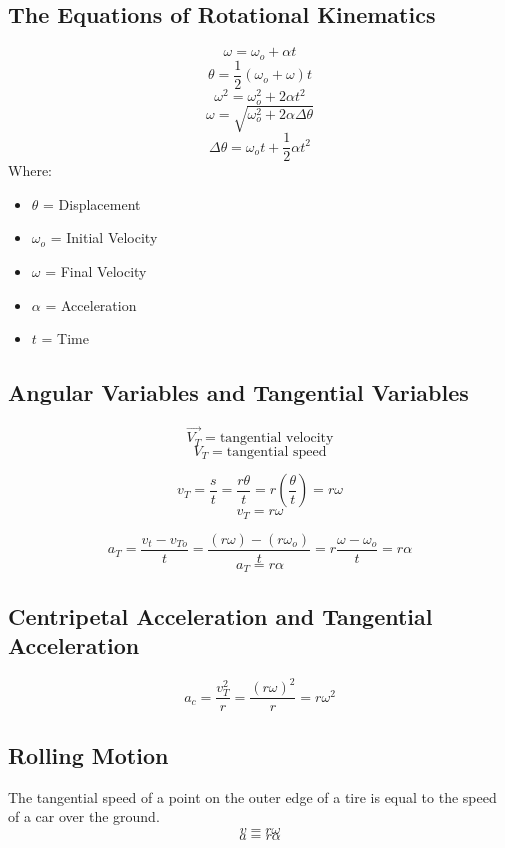\subsection{The Equations of Rotational Kinematics}
\[\omega=\omega_o+\alpha t\]
\[\theta=\frac{1}{2}(\omega_o+\omega)t\]
\[\omega^2=\omega^2_o+2\alpha t^2\]
\[\omega = \sqrt{\omega^2_o + 2 \alpha\Delta\theta}\]
\[\Delta \theta=\omega_o t+\frac{1}{2}\alpha t^2\]
Where: \begin{itemize}
	\item $\theta$ = Displacement
	\item $\omega_o$ = Initial Velocity
	\item $\omega$ = Final Velocity
	\item $\alpha$ = Acceleration
	\item $t$ = Time
\end{itemize}

\subsection{Angular Variables and Tangential Variables}
\[\overrightarrow{V_T} = \text{tangential velocity}\]
\[V_T = \text{tangential speed}\]

\[v_T=\frac{s}{t}=\frac{r\theta}{t}=r\left(\frac{\theta}{t}\right)=r\omega\]
\[v_T=r\omega\]

\[a_T=\frac{v_t-v_{To}}{t}=\frac{(r\omega)-(r\omega_o)}{t}=r\frac{\omega-\omega_o}{t}=r\alpha\]
\[a_T=r\alpha\]

\subsection{Centripetal Acceleration and Tangential Acceleration}
\[a_c=\frac{v^2_T}{r}=\frac{(r\omega)^2}{r}=r\omega^2\]

\subsection{Rolling Motion}
The tangential speed of a point on the outer edge of a tire is equal to the speed of a car over the ground. 
\[v=r\omega\]
\[a=r\alpha\]